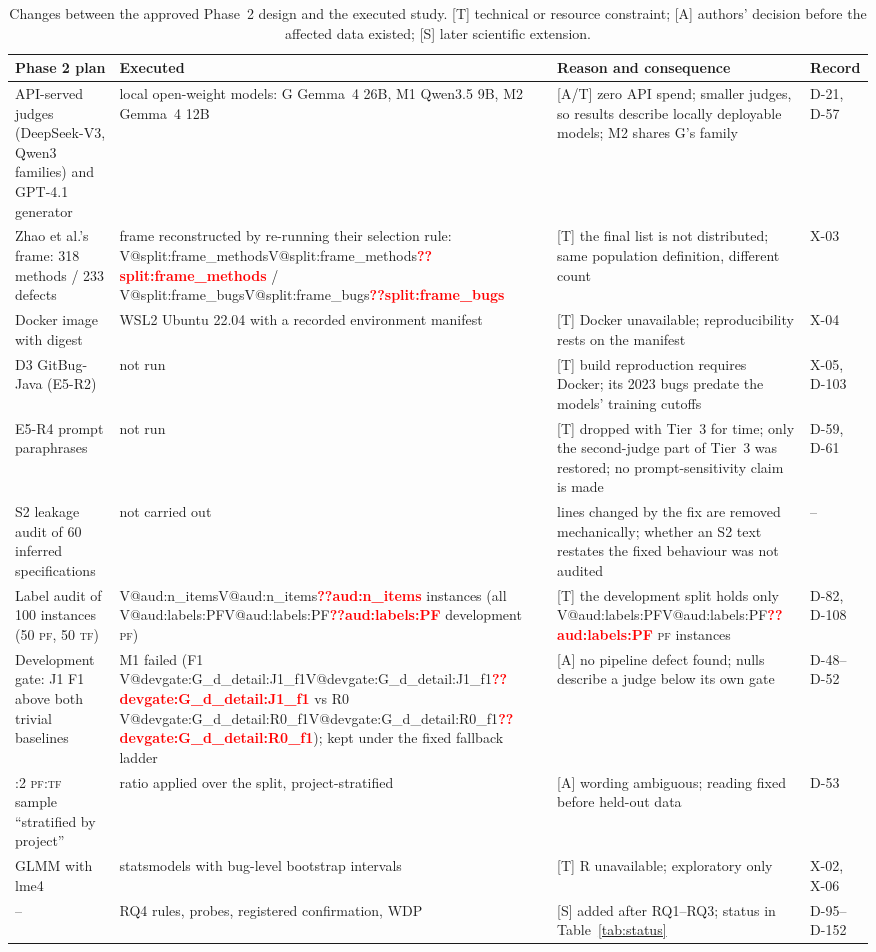 \documentclass[journal]{IEEEtran}
\makeatletter
\newcommand{\V}[1]{\ifcsname V@#1\endcsname\csname V@#1\endcsname\else\textbf{\textcolor{red}{??#1}}\fi}
\newcommand{\PF}{\textsc{pf}}
\newcommand{\TF}{\textsc{tf}}
\makeatother
\begin{document}
\begin{table}[t]
\caption{Changes between the approved Phase~2 design and the executed study. [T] technical or resource constraint; [A] authors' decision before the affected data existed; [S] later scientific extension.}\label{tab:changes}
\scriptsize\setlength{\tabcolsep}{3pt}
\begin{tabularx}{\textwidth}{@{}>{\raggedright\arraybackslash}p{3.3cm} >{\raggedright\arraybackslash}p{4.2cm} Y >{\raggedright\arraybackslash}p{1.6cm}@{}}
\toprule
Phase 2 plan & Executed & Reason and consequence & Record \\
\midrule
API-served judges (DeepSeek-V3, Qwen3 families) and GPT-4.1 generator & local open-weight models: G Gemma~4 26B, M1 Qwen3.5 9B, M2 Gemma~4 12B & [A/T] zero API spend; smaller judges, so results describe locally deployable models; M2 shares G's family & D-21, D-57 \\
Zhao et al.'s frame: 318 methods / 233 defects & frame reconstructed by re-running their selection rule: \V{split:frame_methods} / \V{split:frame_bugs} & [T] the final list is not distributed; same population definition, different count & X-03 \\
Docker image with digest & WSL2 Ubuntu 22.04 with a recorded environment manifest & [T] Docker unavailable; reproducibility rests on the manifest & X-04 \\
D3 GitBug-Java (E5-R2) & not run & [T] build reproduction requires Docker; its 2023 bugs predate the models' training cutoffs & X-05, D-103 \\
E5-R4 prompt paraphrases & not run & [T] dropped with Tier~3 for time; only the second-judge part of Tier~3 was restored; no prompt-sensitivity claim is made & D-59, D-61 \\
S2 leakage audit of 60 inferred specifications & not carried out & lines changed by the fix are removed mechanically; whether an S2 text restates the fixed behaviour was not audited & -- \\
Label audit of 100 instances (50 \PF, 50 \TF) & \V{aud:n_items} instances (all \V{aud:labels:PF} development \PF) & [T] the development split holds only \V{aud:labels:PF} \PF{} instances & D-82, D-108 \\
Development gate: J1 F1 above both trivial baselines & M1 failed (F1 \V{devgate:G_d_detail:J1_f1} vs R0 \V{devgate:G_d_detail:R0_f1}); kept under the fixed fallback ladder & [A] no pipeline defect found; nulls describe a judge below its own gate & D-48--D-52 \\
1:2 \PF{}:\TF{} sample ``stratified by project'' & ratio applied over the split, project-stratified & [A] wording ambiguous; reading fixed before held-out data & D-53 \\
GLMM with lme4 & statsmodels with bug-level bootstrap intervals & [T] R unavailable; exploratory only & X-02, X-06 \\
-- & RQ4 rules, probes, registered confirmation, WDP & [S] added after RQ1--RQ3; status in Table~\ref{tab:status} & D-95--D-152 \\
\bottomrule
\end{tabularx}
\end{table}
\end{document}
